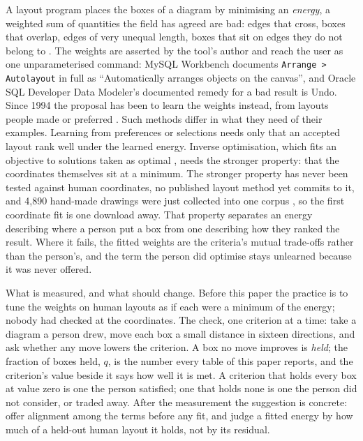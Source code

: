 \documentclass[11pt]{article}
\begin{document}
A layout program places the boxes of a diagram by minimising an \emph{energy}, a weighted
sum of quantities the field has agreed are bad: edges that cross, boxes that overlap, edges
of very unequal length, boxes that sit on edges they do not belong to \cite{tdb88, dh96,
purchase02, kobourov}. The weights are asserted by the tool's author and reach the user
as one unparameterised command: MySQL Workbench documents \texttt{Arrange > Autolayout}
in full as ``Automatically arranges objects on the canvas'', and Oracle SQL Developer
Data Modeler's documented remedy for a bad result is Undo. Since 1994 the
proposal has been to learn the weights instead, from layouts people made or preferred
\cite{masui94, spoenemann14, klammler19, flud22, zhang26}. Such methods differ in what
they need of their examples. Learning from preferences or selections
\cite{masui94, spoenemann14, klammler19, zhang26} needs only that an accepted layout rank
well under the learned energy. Inverse optimisation, which fits an objective to solutions
taken as optimal \cite{ahuja01, keshavarz11, chan19}, needs the stronger property: that the
coordinates themselves sit at a minimum. The stronger property has never been tested
against human coordinates, no published layout method yet commits to it, and 4{,}890
hand-made drawings were just collected into one corpus \cite{gdcoll25}, so the first
coordinate fit is one download away. That property separates an energy describing where
a person put a box from one describing how they ranked the result. Where it fails, the
fitted weights are the criteria's mutual trade-offs rather than the person's, and the term
the person did optimise stays unlearned because it was never offered.

What is measured, and what should change. Before this paper the practice is to tune the
weights on human layouts as if each were a minimum of the energy; nobody had checked at
the coordinates. The check, one criterion at a time: take a diagram a person drew, move
each box a small distance in sixteen directions, and ask whether any move lowers the
criterion. A box no move improves is \emph{held}; the fraction of boxes held, $q$, is
the number every table of this paper reports, and the criterion's value beside it says
how well it is met. A criterion that holds every box at value zero is one the person
satisfied; one that holds none is one the person did not consider, or traded away. After
the measurement the suggestion is concrete: offer alignment among the terms before any
fit, and judge a fitted energy by how much of a held-out human layout it holds, not by
its residual.
\end{document}
